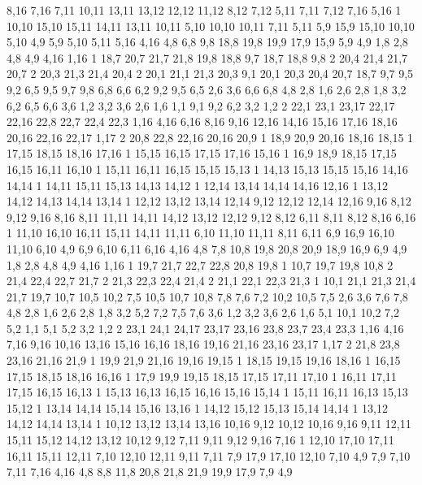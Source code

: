 8,16
7,16
%
7,11
10,11
13,11
13,12
12,12
11,12
8,12
7,12
%
5,11
7,11
7,12
7,16
5,16
1%
10,10
15,10
15,11
14,11
13,11
10,11
%
5,10
10,10
10,11
7,11
5,11
%
5,9
15,9
15,10
10,10
5,10
%
4,9
5,9
5,10
5,11
5,16
4,16
%
4,8
6,8
9,8
18,8
19,8
19,9
17,9
15,9
5,9
4,9
%
1,8
2,8
4,8
4,9
4,16
1,16
1%
18,7
20,7
21,7
21,8
19,8
18,8
%
9,7
18,7
18,8
9,8
2%
20,4
21,4
21,7
20,7
2%
20,3
21,3
21,4
20,4
2%
20,1
21,1
21,3
20,3
%
9,1
20,1
20,3
20,4
20,7
18,7
9,7
9,5
9,2
%
6,5
9,5
9,7
9,8
6,8
6,6
%
6,2
9,2
9,5
6,5
%
2,6
3,6
6,6
6,8
4,8
2,8
%
1,6
2,6
2,8
1,8
%
3,2
6,2
6,5
6,6
3,6
%
1,2
3,2
3,6
2,6
1,6
%
1,1
9,1
9,2
6,2
3,2
1,2
2%
22,1
23,1
23,17
22,17
22,16
22,8
22,7
22,4
22,3
%
1,16
4,16
6,16
8,16
9,16
12,16
14,16
15,16
17,16
18,16
20,16
22,16
22,17
1,17
2%
20,8
22,8
22,16
20,16
20,9
1%
18,9
20,9
20,16
18,16
18,15
1%
17,15
18,15
18,16
17,16
1%
15,15
16,15
17,15
17,16
15,16
1%
16,9
18,9
18,15
17,15
16,15
16,11
16,10
1%
15,11
16,11
16,15
15,15
15,13
1%
14,13
15,13
15,15
15,16
14,16
14,14
1%
14,11
15,11
15,13
14,13
14,12
1%
12,14
13,14
14,14
14,16
12,16
1%
13,12
14,12
14,13
14,14
13,14
1%
12,12
13,12
13,14
12,14
%
9,12
12,12
12,14
12,16
9,16
%
8,12
9,12
9,16
8,16
%
8,11
11,11
14,11
14,12
13,12
12,12
9,12
8,12
%
6,11
8,11
8,12
8,16
6,16
1%
11,10
16,10
16,11
15,11
14,11
11,11
%
6,10
11,10
11,11
8,11
6,11
%
6,9
16,9
16,10
11,10
6,10
%
4,9
6,9
6,10
6,11
6,16
4,16
%
4,8
7,8
10,8
19,8
20,8
20,9
18,9
16,9
6,9
4,9
%
1,8
2,8
4,8
4,9
4,16
1,16
1%
19,7
21,7
22,7
22,8
20,8
19,8
1%
10,7
19,7
19,8
10,8
2%
21,4
22,4
22,7
21,7
2%
21,3
22,3
22,4
21,4
2%
21,1
22,1
22,3
21,3
1%
10,1
21,1
21,3
21,4
21,7
19,7
10,7
10,5
10,2
%
7,5
10,5
10,7
10,8
7,8
7,6
%
7,2
10,2
10,5
7,5
%
2,6
3,6
7,6
7,8
4,8
2,8
%
1,6
2,6
2,8
1,8
%
3,2
5,2
7,2
7,5
7,6
3,6
%
1,2
3,2
3,6
2,6
1,6
%
5,1
10,1
10,2
7,2
5,2
%
1,1
5,1
5,2
3,2
1,2
2%
23,1
24,1
24,17
23,17
23,16
23,8
23,7
23,4
23,3
%
1,16
4,16
7,16
9,16
10,16
13,16
15,16
16,16
18,16
19,16
21,16
23,16
23,17
1,17
2%
21,8
23,8
23,16
21,16
21,9
1%
19,9
21,9
21,16
19,16
19,15
1%
18,15
19,15
19,16
18,16
1%
16,15
17,15
18,15
18,16
16,16
1%
17,9
19,9
19,15
18,15
17,15
17,11
17,10
1%
16,11
17,11
17,15
16,15
16,13
1%
15,13
16,13
16,15
16,16
15,16
15,14
1%
15,11
16,11
16,13
15,13
15,12
1%
13,14
14,14
15,14
15,16
13,16
1%
14,12
15,12
15,13
15,14
14,14
1%
13,12
14,12
14,14
13,14
1%
10,12
13,12
13,14
13,16
10,16
%
9,12
10,12
10,16
9,16
%
9,11
12,11
15,11
15,12
14,12
13,12
10,12
9,12
%
7,11
9,11
9,12
9,16
7,16
1%
12,10
17,10
17,11
16,11
15,11
12,11
%
7,10
12,10
12,11
9,11
7,11
%
7,9
17,9
17,10
12,10
7,10
%
4,9
7,9
7,10
7,11
7,16
4,16
%
4,8
8,8
11,8
20,8
21,8
21,9
19,9
17,9
7,9
4,9
%
